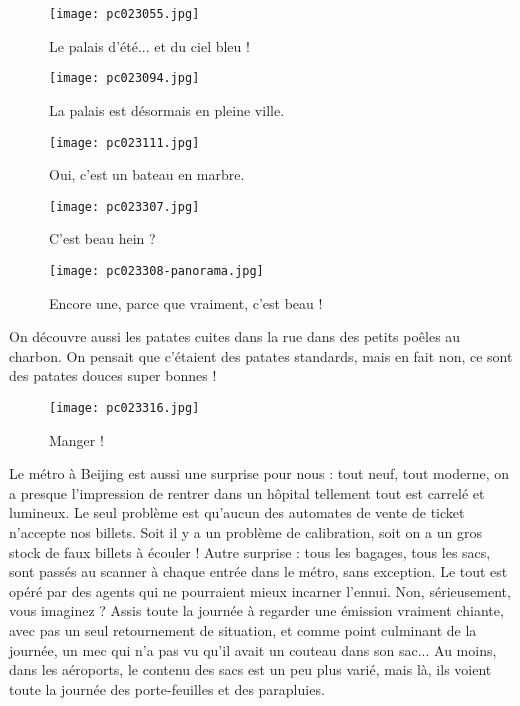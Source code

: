 \documentclass{book}
\begin{document}
\begin{figure}[h]
\centering
\texttt{[image: pc023055.jpg]}
\caption*{ Le palais d'été... et du ciel bleu !}
\end{figure}


\begin{figure}[h]
\centering
\texttt{[image: pc023094.jpg]}
\caption*{ La palais est désormais en pleine ville.}
\end{figure}


\begin{figure}[h]
\centering
\texttt{[image: pc023111.jpg]}
\caption*{ Oui, c'est un bateau en marbre.}
\end{figure}


\begin{figure}[h]
\centering
\texttt{[image: pc023307.jpg]}
\caption*{ C'est beau hein ?}
\end{figure}


\begin{figure}[h]
\centering
\texttt{[image: pc023308-panorama.jpg]}
\caption*{ Encore une, parce que vraiment, c'est beau !}
\end{figure}

On découvre aussi les patates cuites dans la rue dans des petits poêles au charbon. On pensait que c'étaient des patates standards, mais en fait non, ce sont des patates douces super bonnes !


\begin{figure}[h]
\centering
\texttt{[image: pc023316.jpg]}
\caption*{ Manger !}
\end{figure}

Le métro à Beijing est aussi une surprise pour nous : tout neuf, tout moderne, on a presque l'impression de rentrer dans un hôpital tellement tout est carrelé et lumineux. Le seul problème est qu'aucun des automates de vente de ticket n'accepte nos billets. Soit il y a un problème de calibration, soit on a un gros stock de faux billets à écouler ! Autre surprise : tous les bagages, tous les sacs, sont passés au scanner à chaque entrée dans le métro, sans exception. Le tout est opéré par des agents qui ne pourraient mieux incarner l'ennui. Non, sérieusement, vous imaginez ? Assis toute la journée à regarder une émission vraiment chiante, avec pas un seul retournement de situation, et comme point culminant de la journée, un mec qui n'a pas vu qu'il avait un couteau dans son sac... Au moins, dans les aéroports, le contenu des sacs est un peu plus varié, mais là, ils voient toute la journée des porte-feuilles et des parapluies.
\end{document}
